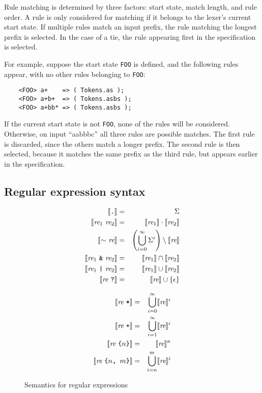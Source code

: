 Rule matching is determined by three factors: start state, match length, and rule order.  A rule is only considered for matching if it belongs to the lexer's current start state.  If multiple rules match an input prefix, the rule matching the longest prefix is selected.  In the case of a tie, the rule appearing first in the specification is selected.

For example, suppose the start state {\tt FOO} is defined, and the following rules appear, with no other rules belonging to {\tt FOO}:
\begin{verbatim}
    <FOO> a+    => ( Tokens.as );
    <FOO> a+b+  => ( Tokens.asbs );
    <FOO> a+bb* => ( Tokens.asbs );
\end{verbatim}
If the current start state is not {\tt FOO}, none of the rules will be considered.  Otherwise, on input ``aabbbc'' all three rules are possible matches.  The first rule is discarded, since the others match a longer prefix.  The second rule is then selected, because it matches the same prefix as the third rule, but appears earlier in the specification.

\subsection{Regular expression syntax}

\newcommand{\REX}{\textit{re}}
\begin{figure}
\begin{minipage}[t]{.5\textwidth}
\begin{eqnarray*}
  \sem{\T{.}} &=& \Sigma \\
  \sem{\REX_1 \ \REX_2} &=& \sem{\REX_1} \cdot \sem{\REX_2} \\
  \sem{\T{$\sim$} \ \REX} &=& \left(\bigcup_{i=0}^\infty \Sigma^i\right)\setminus \sem{\REX} \\
  \sem{\REX_1 \ \T{\&} \ \REX_2} &=& \sem{\REX_1} \cap \sem{\REX_2} \\
  \sem{\REX_1 \ \T{|} \ \REX_2} &=& \sem{\REX_1} \cup \sem{\REX_2} \\
  \sem{\REX \ \T{?}} &=& \sem{\REX} \cup \{ \epsilon \}
\end{eqnarray*}
\end{minipage}\begin{minipage}[t]{.5\textwidth}
\begin{eqnarray*}
  \sem{\REX \ \T{*}} &=& \bigcup_{i=0}^\infty \sem{\REX}^i \\
  \sem{\REX \ \T{+}} &=& \bigcup_{i=1}^\infty \sem{\REX}^i \\
  \sem{\REX \ \T{\{} n \T{\}}} &=& \sem{\REX}^n \\
  \sem{\REX \ \T{\{} n \T{, } m \T{\}}} &=& \bigcup_{i=n}^m \sem{\REX}^i
\end{eqnarray*}
\end{minipage}
\caption{Semantics for regular expressions}\label{ulex-re-semantics}
\end{figure}

